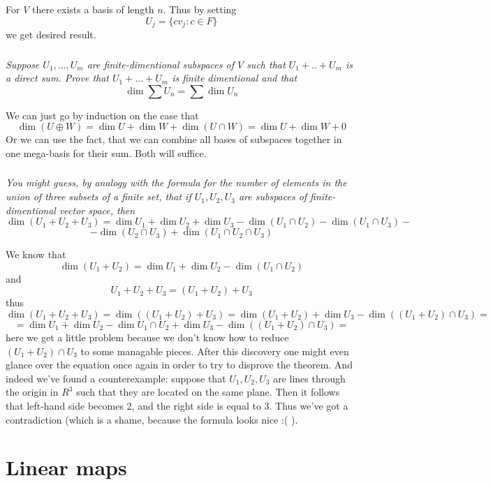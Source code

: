 \documentclass[11pt,oneside,titlepage]{book}
\begin{document}
For $V$ there exists a basis of length $n$. Thus by setting
$$U_j = \{c v_j: c \in F\}$$
we get desired result.

\subsection{}
\textit{Suppose $U_1, ..., U_m$ are finite-dimentional subspaces of $V$ such
  that $U_1 + .. + U_m$ is a direct sum. Prove that $U_1 + ... + U_m$ is
  finite dimentional and that}
$$\dim \sum U_n = \sum \dim U_n$$

We can just go by induction on the case that
$$\dim (U \oplus W) = \dim U + \dim W + \dim (U \cap W) =
\dim U + \dim W + 0$$
Or we can use the fact, that we can combine all bases
of subspaces together in one
mega-basis for their sum. Both will suffice.

\subsection{}
\textit{You might guess, by analogy with the formula for the number of elements
  in the union of three subsets of a finite set, that if $U_1, U_2, U_3$ are
  subspaces of finite-dimentional vector space, then}
$$\dim (U_1 + U_2 + U_3) =
\dim U_1 + \dim U_2 + \dim U_3 - \dim (U_1 \cap U_2) - \dim (U_1 \cap U_3) - $$
$$
- \dim (U_2 \cap U_3)
+ \dim (U_1 \cap U_2 \cap U_3)$$

We know that 
$$\dim (U_1 + U_2) = \dim U_1 + \dim U_2 - \dim (U_1 \cap U_2)$$
and
$$U_1 + U_2 + U_3 = (U_1 + U_2) + U_3$$
thus
$$\dim (U_1 + U_2 + U_3) = \dim ((U_1 + U_2) + U_3) =
\dim (U_1 + U_2) + \dim U_3 - \dim ((U_1 + U_2) \cap U_3) =$$
$$ =
\dim U_1 + \dim U_2 - \dim U_1 \cap U_2 + \dim U_3 -
\dim ((U_1 + U_2) \cap U_3) = $$
here we get a little problem because we don't know how to reduce
$(U_1 + U_2) \cap U_3$ to some managable pieces. After this discovery
one might even glance over
the equation once again in order to try to disprove the theorem.
And indeed we've found a counterexample: suppose that $U_1, U_2, U_3$ are
lines through the origin in $R^3$ such that they are located on the same
plane. Then it follows that left-hand side becomes 2, and the right side is
equal to 3. Thus we've got a contradiction (which is a shame, because
the formula looks nice :( ).

\chapter{Linear maps}
\end{document}
